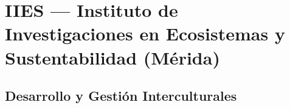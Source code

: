 \section{IIES --- Instituto de Investigaciones en Ecosistemas y Sustentabilidad (Mérida)}

\subsection{Desarrollo y Gestión Interculturales}
\sincodigo
